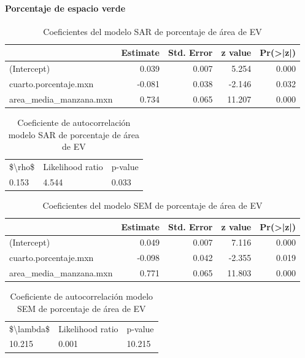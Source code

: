 \documentclass[12pt,]{book}
\let\oldparagraph\paragraph
\renewcommand{\paragraph}[1]{\oldparagraph{#1}\mbox{}}
\begin{document}
\paragraph{Porcentaje de espacio
verde}\label{porcentaje-de-espacio-verde}

\begin{table}

\caption{\label{tab:coef-sar-areaep}Coeficientes del modelo SAR de porcentaje de área de EV}
\centering
\begin{tabular}[t]{lrrrr}
\toprule
  & Estimate & Std. Error & z value & Pr(>|z|)\\
\midrule
(Intercept) & 0.039 & 0.007 & 5.254 & 0.000\\
cuarto.porcentaje.mxn & -0.081 & 0.038 & -2.146 & 0.032\\
area\_media\_manzana.mxn & 0.734 & 0.065 & 11.207 & 0.000\\
\bottomrule
\end{tabular}
\end{table}

\begin{table}

\caption{\label{tab:cauto-sar-areaep}Coeficiente de autocorrelación modelo SAR de porcentaje de área de EV}
\centering
\begin{tabular}[t]{lll}
\toprule
\$\textbackslash{}rho\$ & Likelihood ratio & p-value\\
0.153 & 4.544 & 0.033\\
\bottomrule
\end{tabular}
\end{table}

\begin{table}

\caption{\label{tab:coef-sem-areaep}Coeficientes del modelo SEM de porcentaje de área de EV}
\centering
\begin{tabular}[t]{lrrrr}
\toprule
  & Estimate & Std. Error & z value & Pr(>|z|)\\
\midrule
(Intercept) & 0.049 & 0.007 & 7.116 & 0.000\\
cuarto.porcentaje.mxn & -0.098 & 0.042 & -2.355 & 0.019\\
area\_media\_manzana.mxn & 0.771 & 0.065 & 11.803 & 0.000\\
\bottomrule
\end{tabular}
\end{table}

\begin{table}

\caption{\label{tab:cauto-sem-areaep}Coeficiente de autocorrelación modelo SEM de porcentaje de área de EV}
\centering
\begin{tabular}[t]{lll}
\toprule
\$\textbackslash{}lambda\$ & Likelihood ratio & p-value\\
10.215 & 0.001 & 10.215\\
\bottomrule
\end{tabular}
\end{table}
\end{document}
